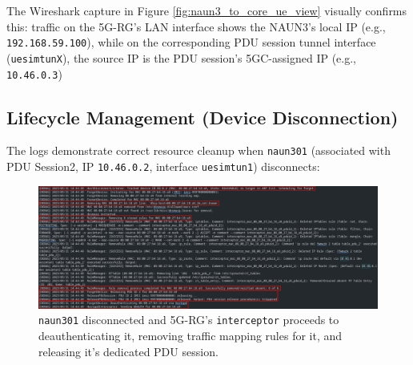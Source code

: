 The Wireshark capture in Figure \ref{fig:naun3_to_core_ue_view} visually confirms this: traffic on the \ac{5G-RG}'s \ac{LAN} interface shows the \ac{NAUN3}'s local \ac{IP} (e.g., \texttt{192.168.59.100}), while on the corresponding \ac{PDU} session tunnel interface (\texttt{uesimtunX}), the source \ac{IP} is the \ac{PDU} session's \ac{5GC}-assigned \ac{IP} (e.g., \texttt{10.46.0.3})

\subsection{Lifecycle Management (Device Disconnection)}

The logs demonstrate correct resource cleanup when \texttt{naun301} (associated with \ac{PDU} Session2, \ac{IP} \texttt{10.46.0.2}, interface \texttt{uesimtun1}) disconnects:

\begin{figure}
    \centering
    \includegraphics[width=1\linewidth]{figs/naun3_removed.png}
    \caption{\texttt{naun301} disconnected and \ac{5G-RG}'s \texttt{interceptor} proceeds to deauthenticating it, removing traffic mapping rules for it, and releasing it's dedicated \ac{PDU} session.}
    \label{fig:naun3_removed}
\end{figure}

